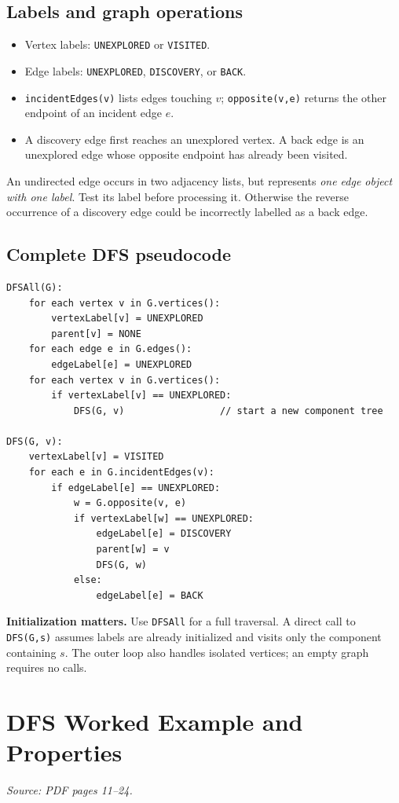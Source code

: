 \documentclass[11pt,letterpaper]{article}
\newcommand{\sourcepages}[1]{\textit{Source: PDF pages #1.}}
\newcommand{\method}[1]{\texttt{#1}}
\begin{document}
\subsection{Labels and graph operations}
\begin{itemize}
    \item Vertex labels: \method{UNEXPLORED} or \method{VISITED}.
    \item Edge labels: \method{UNEXPLORED}, \method{DISCOVERY}, or \method{BACK}.
    \item \method{incidentEdges(v)} lists edges touching $v$; \method{opposite(v,e)} returns the other endpoint of an incident edge $e$.
    \item A discovery edge first reaches an unexplored vertex. A back edge is an unexplored edge whose opposite endpoint has already been visited.
\end{itemize}
An undirected edge occurs in two adjacency lists, but represents \emph{one edge object with one label}. Test its label before processing it. Otherwise the reverse occurrence of a discovery edge could be incorrectly labelled as a back edge.

\subsection{Complete DFS pseudocode}
\begin{lstlisting}
DFSAll(G):
    for each vertex v in G.vertices():
        vertexLabel[v] = UNEXPLORED
        parent[v] = NONE
    for each edge e in G.edges():
        edgeLabel[e] = UNEXPLORED
    for each vertex v in G.vertices():
        if vertexLabel[v] == UNEXPLORED:
            DFS(G, v)                 // start a new component tree

DFS(G, v):
    vertexLabel[v] = VISITED
    for each e in G.incidentEdges(v):
        if edgeLabel[e] == UNEXPLORED:
            w = G.opposite(v, e)
            if vertexLabel[w] == UNEXPLORED:
                edgeLabel[e] = DISCOVERY
                parent[w] = v
                DFS(G, w)
            else:
                edgeLabel[e] = BACK
\end{lstlisting}
\textbf{Initialization matters.} Use \method{DFSAll} for a full traversal. A direct call to \method{DFS(G,s)} assumes labels are already initialized and visits only the component containing $s$. The outer loop also handles isolated vertices; an empty graph requires no calls.

\clearpage
\section{DFS Worked Example and Properties}
\sourcepages{11--24}
\end{document}
